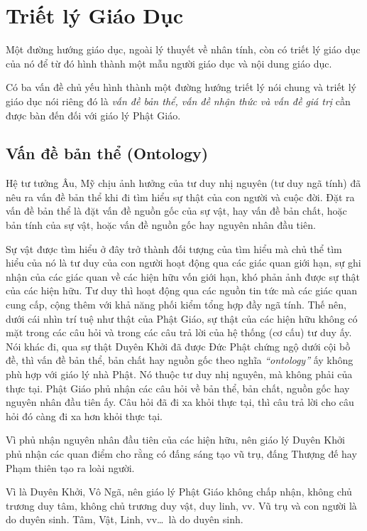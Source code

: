 \chapter{Triết lý Giáo Dục} %
\label{cha:triet_ly_giao_duc}

Một đường hướng giáo dục, ngoài lý thuyết về nhân tính, còn có triết lý giáo dục của nó để từ đó hình thành một mẫu người giáo dục và nội dung giáo dục.

Có ba vấn đề chủ yếu hình thành một đường hướng triết lý nói chung và triết lý giáo dục nói riêng đó là \emph{vấn đề bản thể, vấn đề nhận thức và vấn đề giá trị} cần được bàn đến đối với giáo lý Phật Giáo.

\section{Vấn đề bản thể (Ontology)} %
\label{sec:van_de_ban_the}

Hệ tư tưởng Âu, Mỹ chịu ảnh hưởng của tư duy nhị nguyên (tư duy ngã tính) đã nêu ra vấn đề bản thể khi đi tìm hiểu sự thật của con người và cuộc đời. Đặt ra vấn đề bản thể là đặt vấn đề nguồn gốc của sự vật, hay vấn đề bản chất, hoặc bản tính của sự vật, hoặc vấn đề nguồn gốc hay nguyên nhân đầu tiên.

Sự vật được tìm hiểu ở đây trở thành đối tượng của tìm hiểu mà chủ thể tìm hiểu của nó là tư duy của con người hoạt động qua các giác quan giới hạn, sự ghi nhận của các giác quan về các hiện hữu vốn giới hạn, khó phản ảnh được sự thật của các hiện hữu. Tư duy thì hoạt động qua các nguồn tin tức mà các giác quan cung cấp, cộng thêm với khả năng phối kiểm tổng hợp đầy ngã tính. Thế nên, dưới cái nhìn trí tuệ như thật của Phật Giáo, sự thật của các hiện hữu không có mặt trong các câu hỏi và trong các câu trả lời của hệ thống (cơ cấu) tư duy ấy. Nói khác đi, qua sự thật Duyên Khởi đã được Đức Phật chứng ngộ dưới cội bồ đề, thì vấn đề bản thể, bản chất hay nguồn gốc theo nghĩa \emph{``ontology''} ấy không phù hợp với giáo lý nhà Phật. Nó thuộc tư duy nhị nguyên, mà không phải của thực tại. Phật Giáo phủ nhận các câu hỏi về bản thể, bản chất, nguồn gốc hay nguyên nhân đầu tiên ấy. Câu hỏi đã đi xa khỏi thực tại, thì câu trả lời cho câu hỏi đó càng đi xa hơn khỏi thực tại.

Vì phủ nhận nguyên nhân đầu tiên của các hiện hữu, nên giáo lý Duyên Khởi phủ nhận các quan điểm cho rằng có đấng sáng tạo vũ trụ, đấng Thượng đế hay Phạm thiên tạo ra loài người.

Vì là Duyên Khởi, Vô Ngã, nên giáo lý Phật Giáo không chấp nhận, không chủ trương duy tâm, không chủ trương duy vật, duy linh, vv. Vũ trụ và con người là do duyên sinh. Tâm, Vật, Linh, vv\ldots ~là do duyên sinh.

